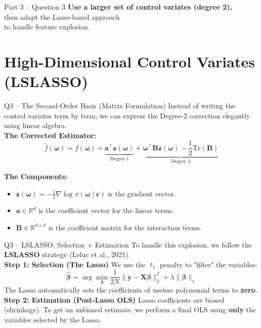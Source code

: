 \documentclass[aspectratio=169]{beamer}
\begin{document}
\begin{frame}{Part 3 -- Question 3}
	\Large
	\textbf{Use a larger set of control variates (degree 2),}\\[0.4em]
	then adapt the Lasso-based approach\\[0.2em]
	to handle feature explosion.
\end{frame}
\section{High-Dimensional Control Variates (LSLASSO)}
\begin{frame}{Q3 -- The Second-Order Basis (Matrix Formulation)}
	\small
	Instead of writing the control variates term by term, we can express the Degree-2 correction elegantly using linear algebra.\\[0.8em]

	\textbf{The Corrected Estimator:}
	\[
		\tilde{f}(\bm{\omega}) = f(\bm{\omega}) + \underbrace{\bm{a}^\top \bm{z}(\bm{\omega})}_{\text{Degree 1}} + \underbrace{\bm{\omega}^\top \bm{B} \bm{z}(\bm{\omega}) - \frac{1}{2}\text{Tr}(\bm{B})}_{\text{Degree 2}}
	\]

	\textbf{The Components:}
	\begin{itemize}
		\item $\bm{z}(\bm{\omega}) = -\frac{1}{2}\nabla \log \pi(\bm{\omega} \mid \bm{r})$ is the gradient vector.
		\item $\bm{a} \in \mathbb{R}^d$ is the coefficient vector for the linear terms.
		\item $\bm{B} \in \mathbb{R}^{d \times d}$ is the coefficient matrix for the interaction terms.
	\end{itemize}
	\vspace{0.8em}

\end{frame}

\begin{frame}{Q3 -- LSLASSO: Selection + Estimation}
	\small
	To handle this explosion, we follow the \textbf{LSLASSO} strategy (Leluc et al., 2021).\\[0.8em]

	\textbf{Step 1: Selection (The Lasso)}
	We use the $\ell_1$ penalty to "filter" the variables:
	\[
		\hat{\bm{\beta}} = \arg\min_{\bm{\beta}} \frac{1}{2N} \|\bm{y} - \bm{X}\bm{\beta}\|_2^2 + \lambda \|\bm{\beta}\|_1
	\]
	The Lasso automatically sets the coefficients of useless polynomial terms to \textbf{zero}.
	\\[0.8em]
	\textbf{Step 2: Estimation (Post-Lasso OLS)}
	Lasso coefficients are biased (shrinkage). To get an unbiased estimate, we perform a final OLS using \textbf{only} the variables selected by the Lasso.
\end{frame}
\end{document}
